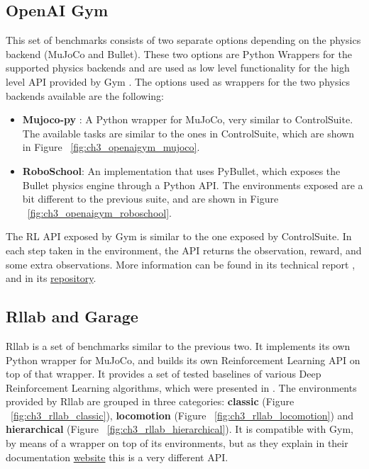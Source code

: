 \subsection{OpenAI Gym}

This set of benchmarks consists of two separate options depending on the physics 
backend (MuJoCo and Bullet). These two options are Python Wrappers for the supported 
physics backends and are used as low level functionality for the high level API provided by Gym \citep{Gym}.
The options used as wrappers for the two physics backends available are the following:

\begin{itemize}
    \item \textbf{Mujoco-py} : A Python wrapper for MuJoCo, very similar to ControlSuite. 
          The available tasks are similar to the ones in ControlSuite, which are shown 
          in Figure ~\ref{fig:ch3_openaigym_mujoco}.

        \figBenchmarkOpenAIGymMujoco

    \item \textbf{RoboSchool}: An implementation that uses PyBullet, which exposes 
          the Bullet physics engine through a Python API. The environments exposed 
          are a bit different to the previous suite, and are shown in Figure ~\ref{fig:ch3_openaigym_roboschool}. 

        \figBenchmarkOpenAIGymRoboschool

\end{itemize}

The RL API exposed by Gym is similar to the one exposed by ControlSuite. 
In each step taken in the environment, the API returns the observation, 
reward, and some extra observations. More information can be found in its 
technical report \citep{Gym}, and in its \href{https://github.com/openai/gym}{repository}.

\subsection{Rllab and Garage} \label{subsec:ch3_rllab}

Rllab is a set of benchmarks similar to the previous two. It implements its own 
Python wrapper for MuJoCo, and builds its own Reinforcement Learning API on top 
of that wrapper. It provides a set of tested baselines of various Deep Reinforcement 
Learning algorithms, which were presented in \cite{Rllab}. The environments provided 
by Rllab are grouped in three categories: \textbf{classic} (Figure ~\ref{fig:ch3_rllab_classic}), 
\textbf{locomotion} (Figure ~\ref{fig:ch3_rllab_locomotion}) and \textbf{hierarchical} 
(Figure ~\ref{fig:ch3_rllab_hierarchical}). It is compatible with Gym, by means of 
a wrapper on top of its environments, but as they explain in their documentation 
\href{https://rllab.readthedocs.io/en/latest/user/gym_integration.html}{website} 
this is a very different API.

